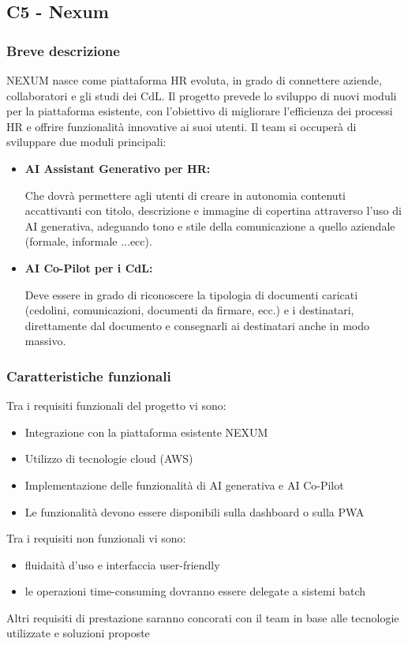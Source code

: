 \documentclass[a4paper,11pt]{article}
\begin{document}
\newpage
\subsection{C5 - Nexum}
\subsubsection{Breve descrizione}
\parbox[t]{\linewidth}{%
NEXUM nasce come piattaforma HR evoluta, in grado di connettere aziende, collaboratori e gli studi dei CdL. Il progetto prevede lo sviluppo di nuovi moduli per la piattaforma esistente, con l'obiettivo di migliorare l'efficienza dei processi HR e offrire funzionalità innovative ai suoi utenti.
Il team si occuperà di sviluppare due moduli principali:
}

\begin{itemize}
\item \textbf{AI Assistant Generativo per HR:} \\
\begin{minipage}[t]{\dimexpr\linewidth-2em}
Che dovrà permettere agli utenti di creare in autonomia contenuti accattivanti con titolo, descrizione e immagine di copertina attraverso l'uso di AI generativa, adeguando tono e stile della comunicazione a quello aziendale (formale, informale ...ecc).
\end{minipage}

\item \textbf{AI Co-Pilot per i CdL:} \\
\begin{minipage}[t]{\dimexpr\linewidth-2em}
Deve essere in grado di riconoscere la tipologia di documenti caricati (cedolini, comunicazioni, documenti da firmare, ecc.) e i destinatari, direttamente dal documento e consegnarli ai destinatari anche in modo massivo.
\end{minipage}
\end{itemize}

\subsubsection{Caratteristiche funzionali}
Tra i requisiti funzionali del progetto vi sono:
\begin{itemize}[noitemsep, topsep=0pt]
  \item Integrazione con la piattaforma esistente NEXUM
  \item Utilizzo di tecnologie cloud (AWS)
  \item Implementazione delle funzionalità di AI generativa e AI Co-Pilot
  \item Le funzionalità devono essere disponibili sulla dashboard o sulla PWA
\end{itemize}
Tra i requisiti non funzionali vi sono:
\begin{itemize}[noitemsep, topsep=0pt]
  \item fluidaità d'uso e interfaccia user-friendly
  \item le operazioni time-consuming dovranno essere delegate a sistemi batch
\end{itemize}
Altri requisiti di prestazione saranno concorati con il team in base alle tecnologie utilizzate e soluzioni proposte
\end{document}

